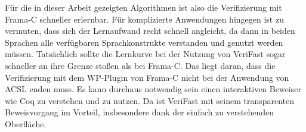 Für die in dieser Arbeit gezeigten Algorithmen ist also die Verifizierung mit Frama-C schneller erlernbar. Für komplizierte
Anwendungen hingegen ist zu vermuten, dass sich der Lernaufwand recht schnell angleicht, da dann in beiden Sprachen
alle verfügbaren Sprachkonstrukte verstanden und genutzt werden müssen. Tatsächlich sollte die Lernkurve bei der Nutzung
von VeriFast sogar schneller an ihre Grenze stoßen als bei Frama-C. Das liegt daran, dass die Verifizierung mit dem WP-Plugin
von Frama-C nicht bei der Anwendung von ACSL enden muss. Es kann durchaus notwendig sein einen interaktiven Beweiser wie Coq
zu verstehen und zu nutzen. Da ist VeriFast mit seinem transparenten Beweisvorgang im Vorteil, insbesondere
dank der einfach zu verstehenden Oberfläche.
